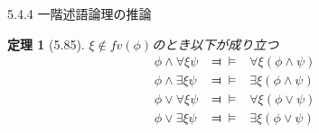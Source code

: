 \documentclass[dvipdfmx,11pt]{beamer}
\newtheorem{theo}[theorem]{定理}
\begin{document}
\begin{frame}{5.4.4 一階述語論理の推論}
  \begin{theo}[5.85]
    \(\xi\not\in\textit{fv}(\phi)\)のとき以下が成り立つ
    \begin{eqnarray*}
      \phi\wedge\forall\xi\psi & \Dashv\vDash & \forall\xi(\phi\wedge\psi) \\
      \phi\wedge\exists\xi\psi & \Dashv\vDash & \exists\xi(\phi\wedge\psi) \\
      \phi\vee\forall\xi\psi & \Dashv\vDash & \forall\xi(\phi\vee\psi) \\
      \phi\vee\exists\xi\psi & \Dashv\vDash & \exists\xi(\phi\vee\psi)
    \end{eqnarray*}
  \end{theo}
\end{frame}


\end{document}
